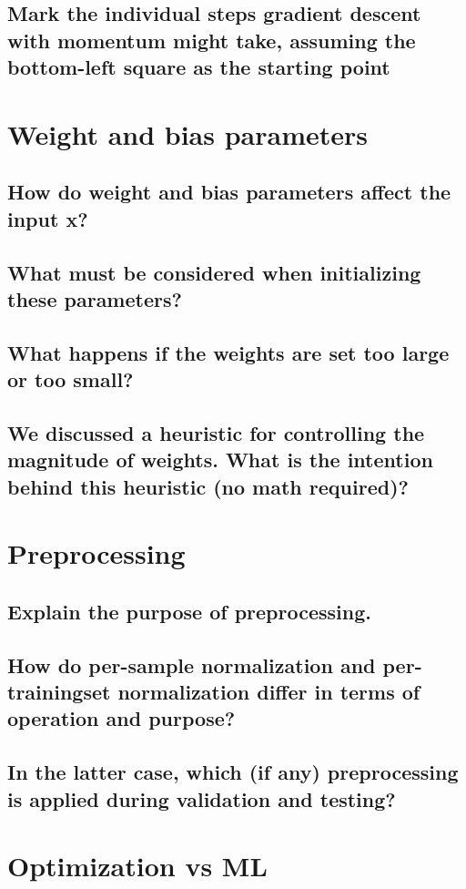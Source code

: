 \subsection{Mark the individual steps gradient descent with momentum might take, assuming the bottom-left square as the starting point}

\section{Weight and bias parameters}
\subsection{How do weight and bias parameters affect the input x?}
\subsection{What must be considered when initializing these parameters?}
\subsection{What happens if the weights are set too large or too small?}
\subsection{We discussed a heuristic for controlling the magnitude of weights. What is the intention behind this heuristic (no math required)?}

\section{Preprocessing}
\subsection{Explain the purpose of preprocessing.}
\subsection{How do per-sample normalization and per-trainingset normalization differ in terms of operation and purpose?}
\subsection{In the latter case, which (if any) preprocessing is applied during validation and testing?}

\section{Optimization vs ML}

